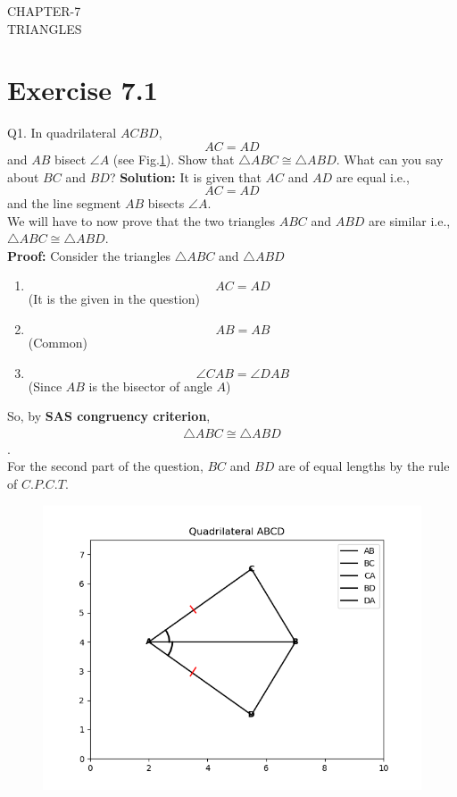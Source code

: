 \documentclass{article}
\newcommand{\solution}{\noindent \textbf{Solution: }}
\begin{document}
\begin{center}
	\textbf\large{CHAPTER-7 \\ TRIANGLES}
\end{center}
\section{Exercise 7.1}
Q1. In quadrilateral $ACBD$, \begin{equation} AC = AD \end{equation} and $AB$ bisect $\angle{A}$ (see Fig.\ref{fig:Fig}). Show that $\triangle{ABC} \cong \triangle{ABD}$. What can you say about $BC$ and $BD$? 
\solution
It is given that $AC$ and $AD$ are equal i.e., \begin{equation} AC = AD \end{equation} and the line segment $AB$ bisects $\angle{A}$.\\
We will have to now prove that the two triangles $ABC$ and $ABD$ are similar i.e., \textbf{$\triangle{ABC} \cong \triangle{ABD}$}.\\
\textbf{Proof:}
Consider the triangles $\triangle{ABC}$ and $\triangle{ABD}$
\begin{enumerate}
	\item							\begin{equation}
			AC = AD
		\end{equation}
		(It is the given in the question)
	\item
		\begin{equation}
			AB = AB                 
		\end{equation}
		(Common)
	\item
		\begin{equation}
			\angle{CAB} = \angle{DAB}
		\end{equation}
		(Since $AB$ is the bisector of angle $A$)
\end{enumerate}
So, by \textbf{SAS congruency criterion}, \begin{align} \triangle{ABC} \cong \triangle{ABD} \end{align}.\\
	For the second part of the question, $BC$ and $BD$ are of equal lengths by the rule of $C.P.C.T$.
\begin{figure}[h]
	\begin{center}
		\includegraphics[width=\columnwidth]{figs/graph.png}
	\end{center}
	\caption{}
	\label{fig:Fig}
\end{figure}
\end{document}
